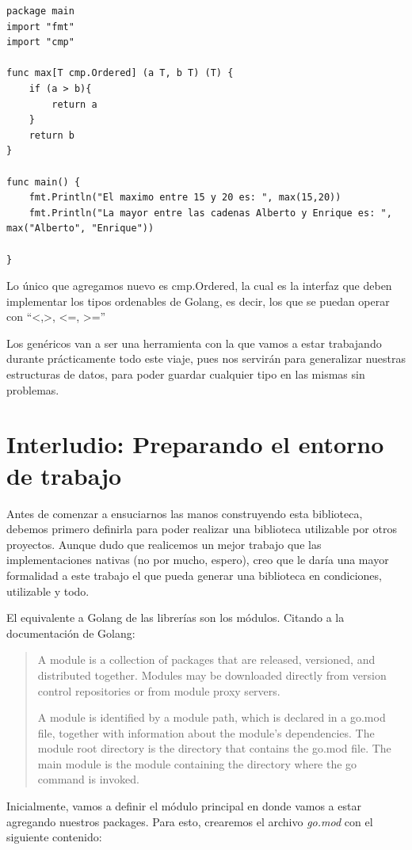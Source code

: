 \documentclass[11pt]{article}
\begin{document}
\begin{verbatim}
package main
import "fmt"
import "cmp"

func max[T cmp.Ordered] (a T, b T) (T) {
	if (a > b){
		return a
	}
	return b
}

func main() {
	fmt.Println("El maximo entre 15 y 20 es: ", max(15,20))
	fmt.Println("La mayor entre las cadenas Alberto y Enrique es: ", max("Alberto", "Enrique"))

}

\end{verbatim}

Lo único que agregamos nuevo es cmp.Ordered, la cual es la interfaz que deben implementar los tipos ordenables de Golang, es decir, los que se puedan operar con ``<,>, <=, >=''

Los genéricos van a ser una herramienta con la que vamos a estar trabajando durante prácticamente todo este viaje, pues nos servirán para generalizar nuestras estructuras de datos, para poder guardar cualquier tipo en las mismas sin problemas.
\section{Interludio: Preparando el entorno de trabajo}
\label{sec:org93dbf1f}

Antes de comenzar a ensuciarnos las manos construyendo esta biblioteca, debemos primero definirla para poder realizar una biblioteca utilizable por otros proyectos. Aunque dudo que realicemos un mejor trabajo que las implementaciones nativas (no por mucho, espero), creo que le daría una mayor formalidad a este trabajo el que pueda generar una biblioteca en condiciones, utilizable y todo.

El equivalente a Golang de las librerías son los módulos. Citando a la documentación de Golang:

\begin{quote}
A module is a collection of packages that are released, versioned, and distributed together. Modules may be downloaded directly from version control repositories or from module proxy servers.

A module is identified by a module path, which is declared in a go.mod file, together with information about the module’s dependencies. The module root directory is the directory that contains the go.mod file. The main module is the module containing the directory where the go command is invoked.
\end{quote}

Inicialmente, vamos a definir el módulo principal en donde vamos a estar agregando nuestros packages. Para esto, crearemos el archivo \emph{go.mod} con el siguiente contenido:
\end{document}
